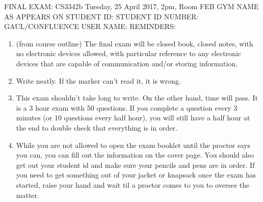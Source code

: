 \documentclass{exam}
\begin{document}
FINAL EXAM: CS3342b Tuesday, 25 April 2017, 2pm, Room FEB GYM\newline
\newline
\newline
\newline
NAME AS APPEARS ON STUDENT ID:\newline
\newline
STUDENT ID NUMBER:\newline
\newline
GAUL/CONFLUENCE USER NAME:\newline
\newline
REMINDERS:
\begin{enumerate}
\item (from course outline) The final exam will be closed book, closed notes, with no electronic devices allowed, with particular reference to any electronic devices that are capable of communication and/or storing information.
\item Write neatly.  If the marker can't read it, it is wrong.
\item This exam shouldn't take long to write.  On the other hand, time will pass.  It is a 3 hour exam with 50 questions.  If you complete a question every 3 minutes (or 10 questions every half hour), you will still have a half hour at the end to double check that everything is in order.
\item While you are not allowed to open the exam booklet until the proctor says you can, you can fill out the information on the cover page.  You should also get out your student id and make sure your pencils and pens are in order.  If you need to get something out of your jacket or knapsack once the exam has started, raise your hand and wait til a proctor comes to you to oversee the matter.
\end{enumerate}
\newpage
\end{document}
